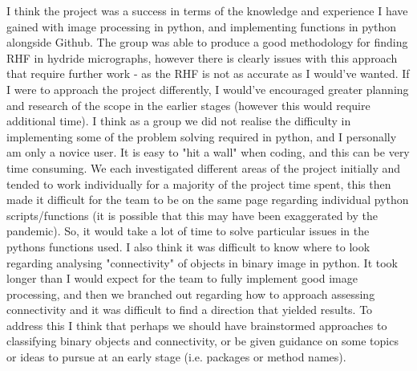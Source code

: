 \documentclass{article}
\begin{document}
I think the project was a success in terms of the knowledge and experience I have gained with image processing in python, and implementing functions in python alongside Github. The group was able to produce a good methodology for finding RHF in hydride micrographs, however there is clearly issues with this approach that require further work - as the RHF is not as accurate as I would've wanted. If I were to approach the project differently, I would've encouraged greater planning and research of the scope in the earlier stages (however this would require additional time). I think as a group we did not realise the difficulty in implementing some of the problem solving required in python, and I personally am only a novice user. It is easy to "hit a wall" when coding, and this can be very time consuming. We each investigated different areas of the project initially and tended to work individually for a majority of the project time spent, this then made it difficult for the team to be on the same page regarding individual python scripts/functions (it is possible that this may have been exaggerated by the pandemic). So, it would take a lot of time to solve particular issues in the pythons functions used. I also think it was difficult to know where to look regarding analysing "connectivity" of objects in binary image in python. It took longer than I would expect for the team to fully implement good image processing, and then we branched out regarding how to approach assessing connectivity and it was difficult to find a direction that yielded results. To address this I think that perhaps we should have brainstormed approaches to classifying binary objects and connectivity, or be given guidance on some topics or ideas to pursue at an early stage (i.e. packages or method names).
\end{document}
